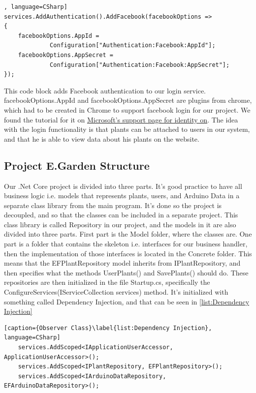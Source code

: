 \documentclass[a4paper,12pt,twoside,openright,titlepage]{book}
\begin{document}
\begin{lstlisting}, language=CSharp] 
services.AddAuthentication().AddFacebook(facebookOptions =>
{
	facebookOptions.AppId =
			 Configuration["Authentication:Facebook:AppId"];
	facebookOptions.AppSecret =
			 Configuration["Authentication:Facebook:AppSecret"];
});
\end{lstlisting}
This code block adds Facebook authentication to our login service. facebookOptions.AppId and facebookOptions.AppSecret are plugins from chrome, which had to be created in Chrome to support facebook login for our project. We found the tutorial for it on \href{https://docs.microsoft.com/en-us/aspnet/core/security/authentication/social/facebook-logins?view=aspnetcore-2.2}{Microsoft's support page for identity on}. The idea with the login functionality is that plants can be attached to users in our system, and that he is able to view data about his plants on the website.


\subsection{Project E.Garden Structure}
Our .Net Core project is divided into three parts. It's good practice to have all business logic i.e. models that represents plants, users, and Arduino Data in a separate class library from the main program. It's done so the project is decoupled, and so that the classes can be included in a separate project. This class library is called Repository in our project, and the models in it are also divided into three parts. First part is the Model folder, where the classes are. One part is a folder that contains the skeleton i.e. interfaces for our business handler, then the implementation of those interfaces is located in the Concrete folder. This means that the EFPlantRepository model inherits from IPlantRepository, and then specifies what the methods UserPlants() and SavePlants() should do. These repositories are then initialized in the file Startup.cs, specifically the ConfigureServices(IServiceCollection services) method. It's initialized with something called Dependency Injection\href{https://docs.microsoft.com/en-us/aspnet/core/fundamentals/dependency-injection?view=aspnetcore-2.2}, and that can be seen in \ref{list:Dependency Injection}


\begin{lstlisting}[caption={Observer Class}\label{list:Dependency Injection}, language=CSharp]
	services.AddScoped<IApplicationUserAccessor, ApplicationUserAccessor>();
	services.AddScoped<IPlantRepository, EFPlantRepository>();
    services.AddScoped<IArduinoDataRepository, EFArduinoDataRepository>();
\end{lstlisting}
\end{document}
